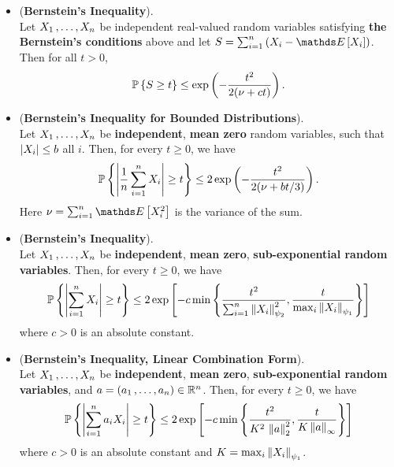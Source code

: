 \documentclass[11pt]{article}
\begin{document}
\begin{itemize}
\item \begin{proposition}(\textbf{Bernstein's Inequality}).  \citep{boucheron2013concentration}\\
Let $X_1 \,{,}\ldots{,}\, X_n$ be independent real-valued random variables satisfying \textbf{the Bernstein's conditions} above and let $S = \sum_{i=1}^{n}\paren{X_i - \E{}{X_i}}$. Then for all $t > 0$,
\begin{align}
{\mathbb P}\left\{S \ge t \right\} \le \exp\left(- \frac{t^2}{2(\nu + ct)}\right).  \label{ineqn: bernstein_inequality_gammar_dist}
\end{align}
\end{proposition}

\item \begin{corollary} (\textbf{Bernstein's Inequality for Bounded Distributions}).  \citep{vershynin2018high}\\
Let $X_1 \,{,}\ldots{,}\, X_n$ be \textbf{independent}, \textbf{mean zero} random variables, such that $\left\lvert X_i \right\rvert \le b$ all $i$. Then, for every $t \ge 0$, we have
\begin{align}
{\mathbb P}\left\{\left\lvert \frac{1}{n}\sum_{i=1}^{n}X_i \right\rvert \ge t\right\} \le 2\exp\left(- \frac{t^2}{2(\nu + bt/3)}\right). \label{ineqn: bernstein_inequality_bounded}
\end{align}
Here $\nu = \sum_{i=1}^{n}\E{}{X_i^2}$ is the variance of the sum.
\end{corollary}


\item \begin{corollary} (\textbf{Bernstein's Inequality}).  \citep{vershynin2018high}\\
Let $X_1 \,{,}\ldots{,}\, X_n$ be \textbf{independent}, \textbf{mean zero}, \textbf{sub-exponential random variables}. Then, for every $t \ge 0$, we have
\begin{align}
{\mathbb P}\left\{\left\lvert \sum_{i=1}^{n}X_i \right\rvert \ge t\right\} \le 2 \exp\left[- c \min\left\{\frac{t^2}{\sum_{i=1}^{n}\left\|X_i\right\|_{\psi_2}^2},  \frac{t}{\max_i \left\|X_i\right\|_{\psi_1}}\right\}\right] \label{ineqn: bernstein_inequality}
\end{align}
where $c > 0$ is an absolute constant.
\end{corollary}

\item 
\begin{proposition} (\textbf{Bernstein's Inequality, Linear Combination Form}).  \citep{vershynin2018high}\\
Let $X_1 \,{,}\ldots{,}\, X_n$ be \textbf{independent}, \textbf{mean zero}, \textbf{sub-exponential random variables}, and $a = (a_1 \,{,}\ldots{,}\, a_n) \in {\mathbb R}^n$. Then, for every $t \ge 0$, we have
\begin{align}
{\mathbb P}\left\{\left\lvert \sum_{i=1}^{n}a_i X_i \right\rvert \ge t\right\} \le 2 \exp\left[- c \min\left\{\frac{t^2}{K^2\, \left\|a\right\|_{2}^2},  \frac{t}{K \left\|a\right\|_{\infty}}\right\}\right] \label{ineqn: bernstein_inequality_linear_comb}
\end{align}
where $c > 0$ is an absolute constant and $K = \max_i \left\|X_i\right\|_{\psi_1}$.
\end{proposition}


\end{itemize}
\end{document}
